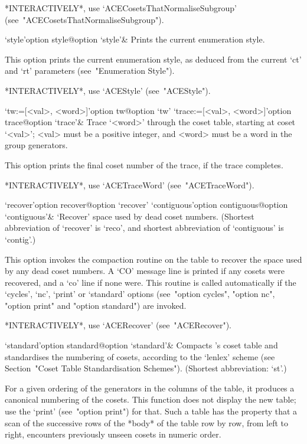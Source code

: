 *INTERACTIVELY*,         use          `ACECosetsThatNormaliseSubgroup'
(see~"ACECosetsThatNormaliseSubgroup").

\>`style'{option style}@{option `style'}&
Prints the current enumeration style.

This option prints the current enumeration style, as deduced from  the
current `ct' and `rt' parameters (see~"Enumeration Style").

*INTERACTIVELY*, use `ACEStyle' (see~"ACEStyle").

\>`tw:=[<val>, <word>]'{option tw}@{option `tw'}
\>`trace:=[<val>, <word>]'{option trace}@{option `trace'}&
Trace `<word>' through the coset table,  starting  at  coset  `<val>';
<val> must be a positive integer, and <word> must be  a  word  in  the
group generators.

This option prints the final coset number of the trace, if  the  trace
completes.

*INTERACTIVELY*, use `ACETraceWord' (see~"ACETraceWord").

\enditems


\beginitems

\>`recover'{option recover}@{option `recover'}
\>`contiguous'{option contiguous}@{option `contiguous'}&
`Recover' space used by dead coset numbers.
(Shortest  abbreviation  of  `recover'   is   `reco',   and   shortest
abbreviation of `contiguous' is `contig'.)

This option invokes the compaction routine on the table to recover the
space used by any dead coset numbers. A `CO' message line  is  printed
if any cosets were recovered, and a  `co'  line  if  none  were.  This
routine is called automatically if  the  `cycles',  `nc',  `print'  or
`standard' options (see~"option cycles", "option nc",  "option  print"
and "option standard") are invoked.

*INTERACTIVELY*, use `ACERecover' (see~"ACERecover").

\>`standard'{option standard}@{option `standard'}&
Compacts {\ACE}'s  coset  table  and  standardises  the  numbering  of
cosets, according to the `lenlex'  scheme  (see  Section~"Coset  Table
Standardisation Schemes"). (Shortest abbreviation: `st'.)

For a given ordering of the generators in the columns of the table, it
produces a canonical numbering of the cosets. This function  does  not
display the new table; use the `print' (see~"option print") for  that.
Such a table has the property that a scan of the  successive  rows  of
the *body* of the table row by row, from  left  to  right,  encounters
previously unseen cosets in numeric order.

